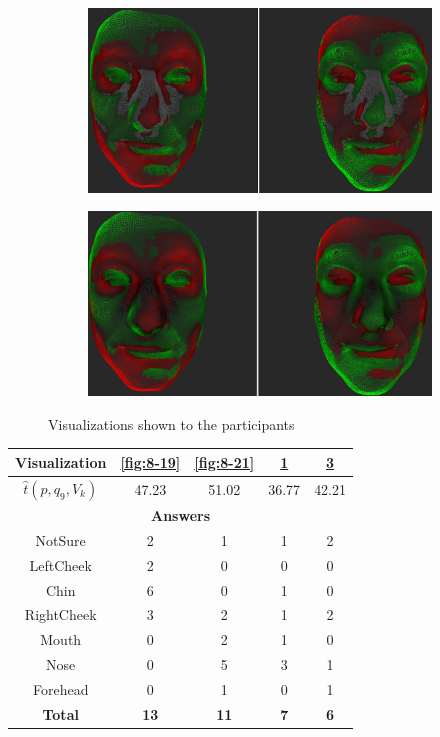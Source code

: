 \begin{figure}[h]
\begin{subfigure}{0.4\textwidth}
\includegraphics[width=\textwidth]{./screenshots/pair23.PNG}
\caption{}
\label{fig:8-23}
\end{subfigure}
\quad
\begin{subfigure}{0.4\textwidth}
\includegraphics[width=\textwidth]{./screenshots/pair20.PNG}
\caption{}
\label{fig:8-20}
\end{subfigure}
\caption{Visualizations shown to the participants}
\end{figure}
\medskip

\begin{center}
\begin{tabular}{| c | c | c | c | c |}
	\hline
	Visualization & \ref{fig:8-19} & \ref{fig:8-21} & \ref{fig:8-23} & \ref{fig:8-20}\\ \hline
	\(\widehat{t}(p, q_9, V_k)\) & 47.23 & 51.02 & 36.77 & 42.21\\ \hline
	\multicolumn{5}{|c|}{\bf Answers} \\ \hline
	NotSure & 2 & 1 & 1 & 2\\ \hline
	LeftCheek & 2 & 0 & 0 & 0\\ \hline
	Chin & 6 & 0 & 1 & 0\\ \hline
	RightCheek & 3 & 2 & 1 & 2\\ \hline
	Mouth & 0 & 2 & 1 & 0\\ \hline
	Nose & 0 & 5 & 3 & 1\\ \hline
	Forehead & 0 & 1 & 0 & 1\\ \hline
	{\bf Total} & {\bf 13} & {\bf 11} & {\bf 7} & {\bf 6}\\ \hline
\end{tabular}
\end{center}
\clearpage

